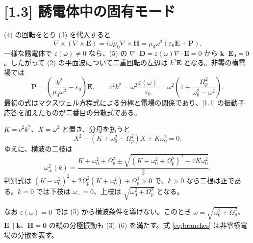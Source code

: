 \documentclass[11pt,a4paper]{article}
\begin{document}
\section*{[1.3] 誘電体中の固有モード}
(4) の回転をとり (3) を代入すると
\begin{equation}
\nabla\times(\nabla\times\boldsymbol E)
=i\omega\mu_0\nabla\times\boldsymbol H
=\mu_0\omega^2(\varepsilon_0\boldsymbol E+\boldsymbol P).
\label{eq:double-curl}
\end{equation}
一様な誘電体で $\varepsilon(\omega)\ne0$ なら、(5) の
$\nabla\cdot\boldsymbol D=\varepsilon(\omega)\nabla\cdot\boldsymbol E=0$ から $\boldsymbol k\cdot\boldsymbol E_0=0$。したがって (2) の平面波について二重回転の左辺は $k^2\boldsymbol E$ となる。非零の横電場では
\begin{equation}
\boxed{\boldsymbol P=\left(\frac{k^2}{\mu_0\omega^2}-\varepsilon_0\right)\boldsymbol E},
\qquad
\boxed{c^2k^2=\omega^2\frac{\varepsilon(\omega)}{\varepsilon_0}
=\omega^2\left(1+\frac{\Omega_p^2}{\omega_0^2-\omega^2}\right)}.
\label{eq:bulk}
\end{equation}
最初の式はマクスウェル方程式による分極と電場の関係であり、[1.1] の振動子応答を加えたものが二番目の分散式である。

$K=c^2k^2$、$X=\omega^2$ と置き、分母を払うと
\begin{equation}
X^2-(K+\omega_0^2+\Omega_p^2)X+K\omega_0^2=0.
\end{equation}
ゆえに、横波の二枝は
\begin{equation}
\boxed{\omega_{\pm}^2(k)=\frac{K+\omega_0^2+\Omega_p^2
\pm\sqrt{(K+\omega_0^2+\Omega_p^2)^2-4K\omega_0^2}}{2}}.
\label{eq:branches}
\end{equation}
判別式は $(K-\omega_0^2)^2+2\Omega_p^2(K+\omega_0^2)+\Omega_p^4>0$ で、$k>0$ なら二根は正である。$k=0$ では下枝は $\omega_-=0$、上枝は $\sqrt{\omega_0^2+\Omega_p^2}$ となる。

なお $\varepsilon(\omega)=0$ では (5) から横波条件を導けない。このとき $\omega=\sqrt{\omega_0^2+\Omega_p^2}$、$\boldsymbol E\parallel\boldsymbol k$、$\boldsymbol H=\boldsymbol 0$ の縦の分極振動も (3)--(6) を満たす。式 \eqref{eq:branches} は非零横電場の分散を表す。
\end{document}
